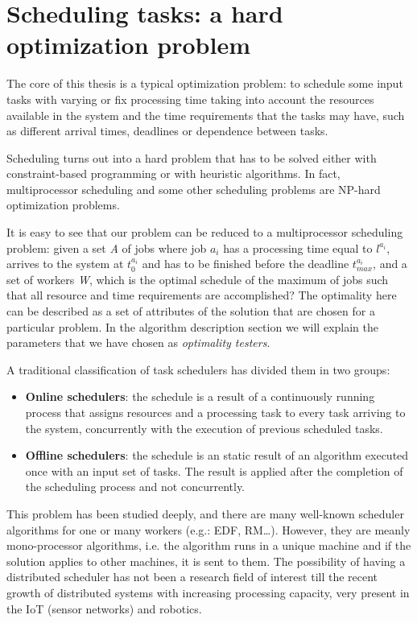 \section{Scheduling tasks: a hard optimization problem}
The core of this thesis is a typical optimization problem: to schedule some input tasks with varying or fix processing time taking into account the resources available in the system and the time requirements that the tasks may have, such as different arrival times, deadlines or dependence between tasks.

Scheduling turns out into a hard problem that has to be solved either with constraint-based programming or with heuristic algorithms. In fact, multiprocessor scheduling and some other scheduling problems are NP-hard optimization problems.

It is easy to see that our problem can be reduced to a multiprocessor scheduling problem: given a set \emph{A} of jobs where job $a_i$ has a processing time equal to $l^{a_{i}}$, arrives to the system at $t_0^{a_i}$ and has to be finished before the deadline $t_{max}^{a_i}$, and a set of workers \emph{W}, which is the optimal schedule of the maximum of jobs such that all resource and time requirements are accomplished? The optimality here can be described as a set of attributes of the solution that are chosen for a particular problem. In the algorithm description section we will explain the parameters that we have chosen as \emph{optimality testers}.

A traditional classification of task schedulers has divided them in two groups:

\begin{itemize}
\item \textbf{Online schedulers}: the schedule is a result of a continuously running process that assigns resources and a processing task to every task arriving to the system, concurrently with the execution of previous scheduled tasks.
\item \textbf{Offline schedulers}: the schedule is an static result of an algorithm executed once with an input set of tasks. The result is applied after the completion of the scheduling process and not concurrently.
\end{itemize}

This problem has been studied deeply, and there are many well-known scheduler algorithms for one or many workers (e.g.: EDF,  RM…). However, they are meanly mono-processor algorithms, i.e. the algorithm runs in a unique machine and if the solution applies to other machines, it is sent to them. The possibility of having a distributed scheduler has not been a research field of interest till the recent growth of distributed systems with increasing processing capacity, very present in the IoT (sensor networks) and robotics.

